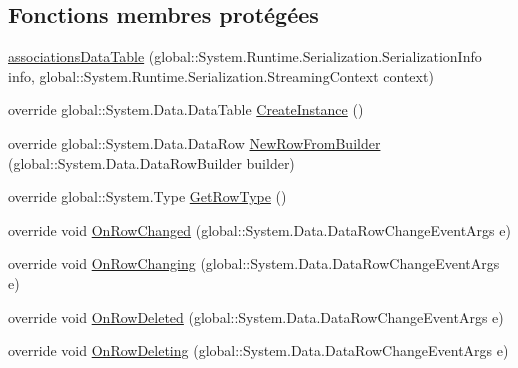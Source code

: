 \subsection*{Fonctions membres protégées}
\begin{DoxyCompactItemize}
\item 
\hyperlink{classforma_1_1formadb_data_set_1_1associations_data_table_a1707561947645eaf5d9458ec8b7d3ae8}{associations\+Data\+Table} (global\+::\+System.\+Runtime.\+Serialization.\+Serialization\+Info info, global\+::\+System.\+Runtime.\+Serialization.\+Streaming\+Context context)
\item 
override global\+::\+System.\+Data.\+Data\+Table \hyperlink{classforma_1_1formadb_data_set_1_1associations_data_table_a715370141d2ecbcf6b0a2e7031e49958}{Create\+Instance} ()
\item 
override global\+::\+System.\+Data.\+Data\+Row \hyperlink{classforma_1_1formadb_data_set_1_1associations_data_table_ac09a8386c0c2d97b17403c154acc1f89}{New\+Row\+From\+Builder} (global\+::\+System.\+Data.\+Data\+Row\+Builder builder)
\item 
override global\+::\+System.\+Type \hyperlink{classforma_1_1formadb_data_set_1_1associations_data_table_a602b4997d5344a97108e02c1dcb363c8}{Get\+Row\+Type} ()
\item 
override void \hyperlink{classforma_1_1formadb_data_set_1_1associations_data_table_a770b63f841ece18639465762e65cabad}{On\+Row\+Changed} (global\+::\+System.\+Data.\+Data\+Row\+Change\+Event\+Args e)
\item 
override void \hyperlink{classforma_1_1formadb_data_set_1_1associations_data_table_adaf01fbd80ed80fcfe9da465d3364324}{On\+Row\+Changing} (global\+::\+System.\+Data.\+Data\+Row\+Change\+Event\+Args e)
\item 
override void \hyperlink{classforma_1_1formadb_data_set_1_1associations_data_table_aec95d13bc9cfd9e033bcf3b2034d3ec7}{On\+Row\+Deleted} (global\+::\+System.\+Data.\+Data\+Row\+Change\+Event\+Args e)
\item 
override void \hyperlink{classforma_1_1formadb_data_set_1_1associations_data_table_a626674372302313b5e1a18963fc4c703}{On\+Row\+Deleting} (global\+::\+System.\+Data.\+Data\+Row\+Change\+Event\+Args e)
\end{DoxyCompactItemize}
